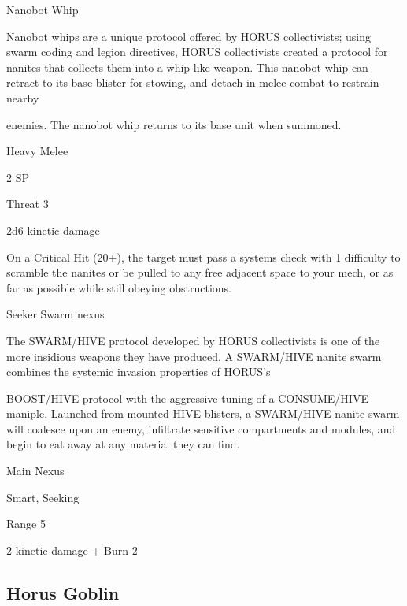 Nanobot Whip  

Nanobot whips are a unique protocol offered by HORUS collectivists; using swarm coding and legion  
directives, HORUS collectivists created a protocol for nanites that collects them into a whip-like weapon.  
This nanobot whip can retract to its base blister for stowing, and detach in melee combat to restrain nearby  

enemies. The nanobot whip returns to its base unit when summoned.   

Heavy Melee
 
2 SP
 
Threat 3
 
2d6 kinetic damage
 
On a Critical Hit (20+), the target must pass a systems check with 1 difficulty to scramble the  
nanites or be pulled to any free adjacent space to your mech, or as far as possible while still  
obeying obstructions.
 

Seeker Swarm nexus  

The SWARM/HIVE protocol developed by HORUS collectivists is one of the more insidious weapons they  
have produced. A SWARM/HIVE nanite swarm combines the systemic invasion properties of HORUS’s  

BOOST/HIVE protocol with the aggressive tuning of a CONSUME/HIVE maniple. Launched from mounted  
HIVE blisters, a SWARM/HIVE nanite swarm will coalesce upon an enemy, infiltrate sensitive compartments  
and modules, and begin to eat away at any material they can find.  

Main Nexus
 
Smart, Seeking
 

                                                                                                           


Range 5
 
2 kinetic damage + Burn 2
 

                                                                                                          


                                                                                                              

                                                                                                               \subsection{Horus Goblin}


